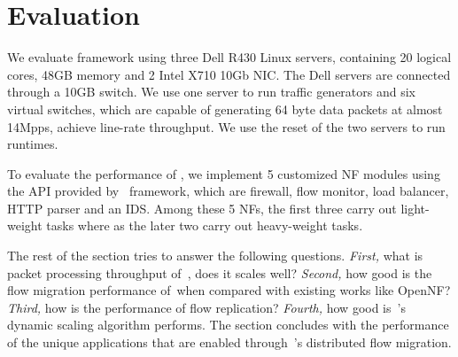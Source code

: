 \section{Evaluation}
\label{sec:experiments}



We evaluate \nfactor framework using three Dell R430 Linux servers, containing 20 logical cores, 48GB memory and 2 Intel X710 10Gb NIC. The Dell servers are connected through a 10GB switch. We use one server to run traffic generators and six virtual switches, which are capable of generating 64 byte data packets at almost 14Mpps, achieve line-rate throughput. We use the reset of the two servers to run runtimes.

To evaluate the performance of \nfactor, we implement 5 customized NF modules using the API provided by \nfactor~framework, which are firewall, flow monitor, load balancer, HTTP parser and an IDS. Among these 5 NFs, the first three carry out light-weight tasks where as the later two carry out heavy-weight tasks.

The rest of the section tries to answer the following questions. \textit{First, } what is packet processing throughput of~\nfactor, does it scales well? \textit{Second,} how good is the flow migration performance of~\nfactor when compared with existing works like OpenNF? \textit{Third,} how is the performance of flow replication? \textit{Fourth,} how good is~\nfactor's dynamic scaling algorithm performs. The section concludes with the performance of the unique applications that are enabled through~\nfactor's distributed flow migration.

